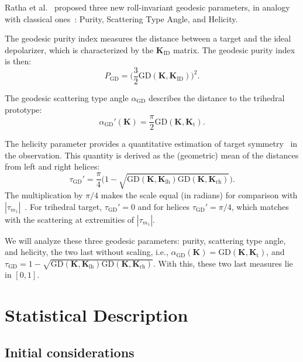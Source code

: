 \documentclass[journal]{IEEEtran}
\begin{document}
{Ratha et al.~\cite{APolSARScatteringPowerFactorizationFrameworkandNovelRollInvariantParametersBasedUnsupervisedClassificationSchemeUsingaGeodesicDistanceinpress} proposed three new roll-invariant geodesic parameters, in analogy with classical ones~\cite{gil85,CloudePottier:97,Touzi:TGARS:2007}: Purity, Scattering Type Angle, and Helicity.

The geodesic purity index measures the distance between a target and the ideal depolarizer, which is characterized by the $\bm{K}_{\text{ID}}$ matrix.
The geodesic purity index is then:
\begin{equation}
	P_{\text{GD}} = \Big(\frac{3}{2}\text{GD}(\bm{K}, \bm{K}_{\text{ID}})\Big)^2.
\end{equation}

The geodesic scattering type angle $\alpha_{\text{GD}}$ describes 
the distance to the trihedral prototype:
\begin{equation}
	\alpha_{\text{GD}}'(\bm{K}) = \frac{\pi}{2}  \text{GD}(\bm{K},\bm{K}_{\text{t}}).
\end{equation}

The helicity parameter provides a quantitative estimation of target symmetry~\cite{Touzi:TGARS:2007} in the observation. 
This quantity is derived as the (geometric) mean of the distances from left and right helices:
\begin{equation}
	\tau_{\text{GD}}' = \frac\pi4 \big(1 - \sqrt{\text{GD}(\bm{K},\bm{K}_{\text{lh}})\text{GD}(\bm{K},\bm{K}_{\text{rh}})}\big).
\end{equation}
The multiplication by $\pi/4$ makes the scale equal (in radians) for comparison with $|\tau_{m_1}|$~\cite{Touzi:TGARS:2007}. 
For trihedral target, $\tau_{\text{GD}}' = 0$ and for helices $\tau_{\text{GD}}' = \pi/4$, which matches with the scattering at extremities of $|\tau_{m_1}|$.

We will analyze these three geodesic parameters:
purity, scattering type angle, and helicity, the two last without scaling, i.e., $\alpha_{\text{GD}}(\bm{K}) = \text{GD}(\bm{K},\bm{K}_{\text{t}})$, and 
$\tau_{\text{GD}} = 1 - \sqrt{\text{GD}(\bm{K},\bm{K}_{\text{lh}})\text{GD}(\bm{K},\bm{K}_{\text{rh}})}$.
With this, these two last measures lie in $[0,1]$.

\section{Statistical Description}

\subsection{Initial considerations}

}
\end{document}
